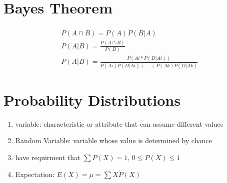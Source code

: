 \documentclass[11pt]{amsart}
\begin{document}
\section{Bayes Theorem}
\begin{equation}
\begin{aligned}
  P(A \cap B) = P(A)\dot P(B|A)\\
  P(A|B)=\frac{P(A \cap B)}{P(B)}\\
  P(A|B)= \frac{P(Ai*P(D|Ai))}{P(Ai)P(D|Ai)+\dots+ P(Ak)P(D|Ak)}
\end{aligned}
\end{equation}
\section{Probability Distributions}
\begin{enumerate}
  \item variable: characteristic  or attribute that can assume different
values
  \item Random Variable: variable whose value is determined by chance
  \item have requirment that $\sum P(X) = 1$, $0 \leq P(X) \leq 1$
  \item Expectation: $E(X) = \mu = \sum X \dot P(X)$
\end{enumerate}
\end{document}
